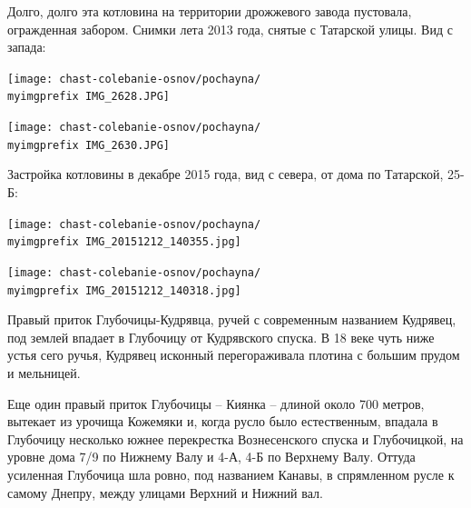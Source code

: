 Долго, долго эта котловина на территории дрожжевого завода пустовала, огражденная забором. Снимки лета 2013 года, снятые с Татарской улицы. Вид с запада: 

\begin{center}
\texttt{[image: chast-colebanie-osnov/pochayna/\\myimgprefix IMG\_2628.JPG]}
\end{center}

\begin{center}
\texttt{[image: chast-colebanie-osnov/pochayna/\\myimgprefix IMG\_2630.JPG]}
\end{center}

\newpage

Застройка котловины в декабре 2015 года, вид с севера, от дома по Татарской, 25-Б:

\begin{center}
\texttt{[image: chast-colebanie-osnov/pochayna/\\myimgprefix IMG\_20151212\_140355.jpg]}
\end{center}

\begin{center}
\texttt{[image: chast-colebanie-osnov/pochayna/\\myimgprefix IMG\_20151212\_140318.jpg]}
\end{center}

\newpage

Правый приток Глубочицы-Кудрявца, ручей с современным названием Кудрявец, под землей впадает в Глубочицу от Кудрявского спуска. В 18 веке чуть ниже устья сего ручья, Кудрявец исконный перегораживала плотина с большим прудом и мельницей.


Еще один правый приток Глубочицы – Киянка – длиной около 700 метров, вытекает из урочища Кожемяки и, когда русло было естественным, впадала в Глубочицу несколько южнее перекрестка Вознесенского спуска и Глубочицкой, на уровне дома 7/9 по Нижнему Валу и 4-А, 4-Б по Верхнему Валу. Оттуда усиленная Глубочица шла ровно, под названием Канавы, в спрямленном русле к самому Днепру, между улицами Верхний и Нижний вал.


